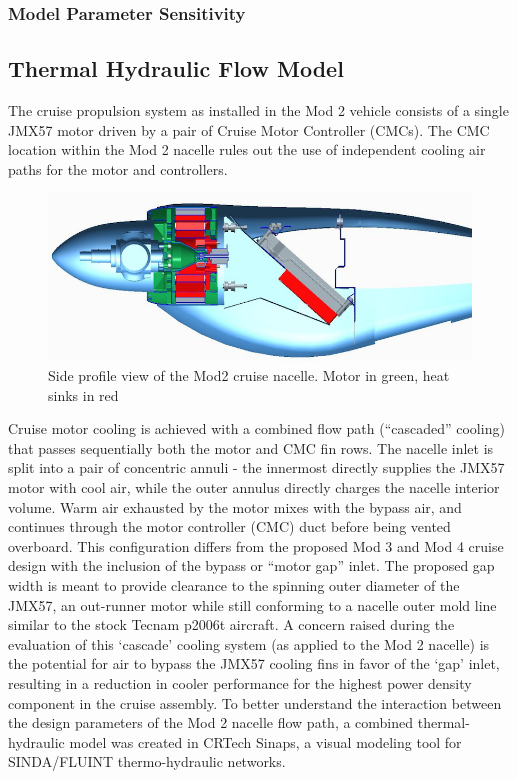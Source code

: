 \documentclass[]{aiaa-tc}%
\begin{document}
\subsubsection{Model Parameter Sensitivity}


\subsection{Thermal Hydraulic Flow Model}

The cruise propulsion system as installed in the Mod 2 vehicle consists of a single JMX57 motor driven by a pair of Cruise Motor Controller (CMCs).  The CMC location within the Mod 2 nacelle rules out the use of independent cooling air paths for the motor and controllers.  

\begin{figure}[!h]%
	\centering
	\includegraphics[width=1.0\textwidth]{figures/mod2_profile.png}
	\caption{Side profile view of the Mod2 cruise nacelle. Motor in green, heat sinks in red}
	\label{fig:Mod2Profile}
\end{figure}


Cruise motor cooling is achieved with a combined flow path (“cascaded” cooling) that passes sequentially both the motor and CMC fin rows.  The nacelle inlet is split into a pair of concentric annuli - the innermost directly supplies the JMX57 motor with cool air, while the outer annulus directly charges the nacelle interior volume.  Warm air exhausted by the motor mixes with the bypass air, and continues through the motor controller (CMC) duct before being vented overboard.  
This configuration differs from the proposed Mod 3 and Mod 4 cruise design with the inclusion of the bypass or “motor gap” inlet.  The proposed gap width is meant to provide clearance to the spinning outer diameter of the JMX57, an out-runner motor while still conforming to a nacelle outer mold line similar to the stock Tecnam p2006t aircraft. 
A concern raised during the evaluation of this ‘cascade’ cooling system (as applied to the Mod 2 nacelle) is the potential for air to bypass the JMX57 cooling fins in favor of the ‘gap’ inlet, resulting in a reduction in cooler performance for the highest power density component in the cruise assembly.  
To better understand the interaction between the design parameters of the Mod 2 nacelle flow path, a combined thermal-hydraulic model was created in CRTech Sinaps, a visual modeling tool for SINDA/FLUINT thermo-hydraulic networks. 
\end{document}
